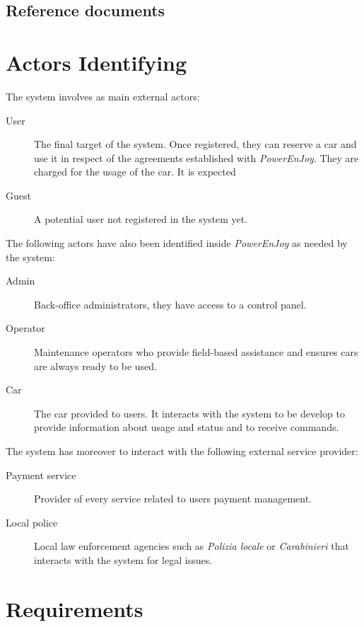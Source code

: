 \documentclass{article}
\begin{document}
		\subsection{Reference documents}

	\newpage
	\section{Actors Identifying}
		The system involves as main external actors:
		\begin{description}
			\item[User] The final target of the system. Once registered, they can reserve a car and use it in respect of the agreements established with \textit{PowerEnJoy}. They are charged for the usage of the car. It is expected

			\item[Guest] A potential user not registered in the system yet.
		\end{description}
		The following actors have also been identified inside \textit{PowerEnJoy} as needed by the system:
		\begin{description}
			\item[Admin] Back-office administrators, they have access to a control panel.

			\item[Operator] Maintenance operators who provide field-based assistance and ensures cars are always ready to be used.

			\item[Car] The car provided to users. It interacts with the system to be develop to provide information about usage and status and to receive commands.
		\end{description}
		The system has moreover to interact with the following external service provider:
		\begin{description}
			\item[Payment service] Provider of every service related to users payment management.
			\item[Local police] Local law enforcement agencies such as \textit{Polizia locale} or \textit{Carabinieri} that interacts with the system for legal issues.
		\end{description}

	\newpage
	\section{Requirements}
	
\end{document}
